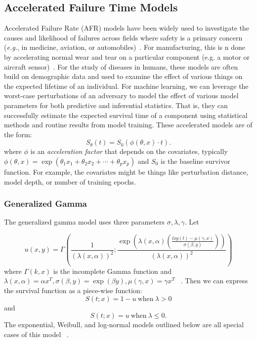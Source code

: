 \subsection{Accelerated Failure Time Models}
Accelerated Failure Rate (AFR) models have been widely used to investigate the causes and likelihood of failures across fields where safety is a primary concern (\textit{e.g.}, in medicine, aviation, or automobiles)~\citep{liu2013development,lawless1995methods}. For manufacturing, this is n done by accelerating normal wear and tear on a particular component (e.g. a motor or aircraft sensor)~\citep{liu2013development}. For the study of diseases in humans, these models are often build on demographic data and used to examine the effect of various things on the expected lifetime of an individual. For machine learning, we can leverage the worst-case perturbations of an adversary to model the effect of various model parameters for both predictive and inferential statistics. That is, they can successfully estimate the expected survival time of a component using statistical methods and routine results from model training. These accelerated models are of the form:
$$
	S_\theta(t) = S_0(\phi(\theta, x) \cdot t).
$$
where $\phi$ is an \textit{acceleration factor} that depends on the covariates, typically $\phi(\theta, x) = \exp{(\theta_1 x_1 + \theta_2 x_2 + \cdots + \theta_p x_p)}$ and $S_0$ is the baseline survivor function. For example, the covariates might be things like perturbation distance, model depth, or number of training epochs.

\subsubsection{Generalized Gamma}
The generalized gamma model uses three parameters $\sigma, \lambda,\gamma$. Let

$$
u (x,y)= \Gamma \left ( \frac{1}{(\lambda(x, \alpha))^2}; \frac{\exp \left( \lambda(x, \alpha) \left( \frac{log(t) - \mu(\gamma, x)}{\sigma(\beta, y)} \right ) \right) }{(\lambda(x, \alpha))^2} \right )
$$
where $\Gamma(k, x)$ is the incomplete Gamma function and $ \lambda(x, \alpha) = \alpha x^T, \sigma(\beta, y) = \exp(\beta y ),   \mu(\gamma, x) = \gamma x^T$ ~\cite{aft_models}. Then we can express the survival function as a piece-wise function:
$$
S(t; x) =  1 - u~\text{when}~\lambda > 0 
$$
and
$$
S(t; x) =  u~\text{when}~\lambda \leq 0 .
$$ 
The exponential, Weibull, and log-normal models outlined below are all special cases of this model ~\cite{kleinbaum1996survival}.

